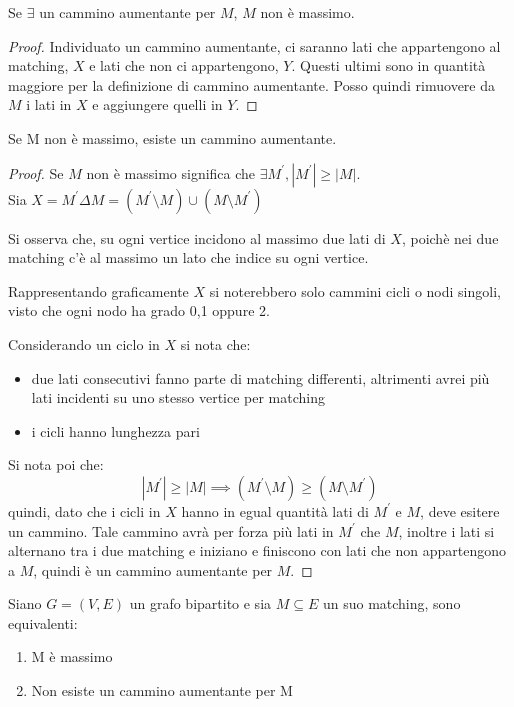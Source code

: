 \begin{theorem}
    Se $\exists$ un cammino aumentante per $M$, $M$ non è massimo.
\end{theorem}
\begin{proof}
    Individuato un cammino aumentante, ci saranno lati che appartengono al matching, $X$ 
    e lati che non ci appartengono, $Y$. Questi ultimi sono in quantità maggiore per la definizione
    di cammino aumentante. Posso quindi rimuovere da $M$ i lati in $X$ e aggiungere quelli in $Y$.
\end{proof}
\begin{theorem}
    Se M non è massimo, esiste un cammino aumentante.
\end{theorem}
\begin{proof}
    Se $M$ non è massimo significa che $\exists M^\prime, |M^\prime| \geq |M|$.\\
    Sia $X = M^\prime \Delta M = (M^\prime \setminus M) \cup (M \setminus M^\prime)$

    Si osserva che, su ogni vertice incidono al massimo due lati di $X$, poichè 
    nei due matching c'è al massimo un lato che indice su ogni vertice.

    Rappresentando graficamente $X$ si noterebbero solo cammini cicli o nodi singoli, visto che
    ogni nodo ha grado 0,1 oppure 2.

    Considerando un ciclo in $X$ si nota che: 
    \begin{itemize}
        \item due lati consecutivi fanno parte di matching 
        differenti, altrimenti avrei più lati incidenti su uno stesso vertice per matching
        \item i cicli hanno lunghezza pari
    \end{itemize}
    Si nota poi che: $$|M^\prime| \geq |M| \implies (M^\prime \setminus M) \geq (M \setminus M^\prime)$$ 
    quindi, dato che i cicli in $X$ hanno in egual quantità lati di $M^\prime$ e $M$, deve 
    esitere un cammino. Tale cammino avrà per forza più lati in $M^\prime$ che $M$, inoltre
    i lati si alternano tra i due matching e iniziano e finiscono con 
    lati che non appartengono a $M$, quindi è un cammino aumentante per $M$.
\end{proof}
\begin{theorem}
    Siano $G = (V,E)$ un grafo bipartito e sia $M \subseteq E$ un suo matching, sono 
    equivalenti:
    \begin{enumerate}
        \item M è massimo
        \item Non esiste un cammino aumentante per M
    \end{enumerate}
\end{theorem}

